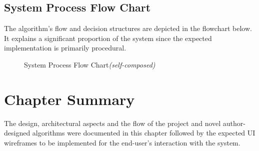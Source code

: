 \pagebreak
\subsection{System Process Flow Chart}
The algorithm's flow and decision structures are depicted in the flowchart below. It explains a significant proportion of the system since the expected implementation is primarily procedural.

\begin{figure}[h!]
\centering
\setlength{\fboxsep}{10pt}%
\setlength{\fboxrule}{0.5pt}%
\caption{System Process Flow Chart\textit{(self-composed)}}
\label{fig:system-process-flowchart}
\end{figure}


\section{Chapter Summary}
The design, architectural aspects and the flow of the project and novel author-designed algorithms were documented in this chapter followed by the expected UI wireframes to be implemented for the end-user's interaction with the system.
